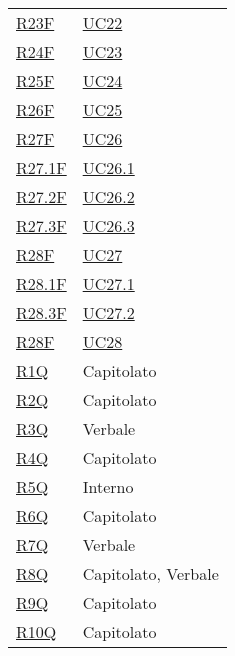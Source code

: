\begin{center}
\begin{longtable}[!h]{p{50px} p{50px}}
        \hyperref[tab:RequisitiFunzionali]{R23F}     & \hyperref[sec:UC22]{UC22}     \\
        \hyperref[tab:RequisitiFunzionali]{R24F}     & \hyperref[sec:UC23]{UC23}     \\
        \hyperref[tab:RequisitiFunzionali]{R25F}     & \hyperref[sec:UC24]{UC24}     \\
        \hyperref[tab:RequisitiFunzionali]{R26F}     & \hyperref[sec:UC25]{UC25}     \\
        \hyperref[tab:RequisitiFunzionali]{R27F}     & \hyperref[sec:UC26]{UC26}     \\
        \hyperref[tab:RequisitiFunzionali]{R27.1F}   & \hyperref[sec:UC26.1]{UC26.1} \\
        \hyperref[tab:RequisitiFunzionali]{R27.2F}   & \hyperref[sec:UC26.2]{UC26.2} \\
        \hyperref[tab:RequisitiFunzionali]{R27.3F}   & \hyperref[sec:UC26.3]{UC26.3} \\
        \hyperref[tab:RequisitiFunzionali]{R28F}     & \hyperref[sec:UC27]{UC27}     \\
        \hyperref[tab:RequisitiFunzionali]{R28.1F}   & \hyperref[sec:UC27.1]{UC27.1} \\
        \hyperref[tab:RequisitiFunzionali]{R28.3F}   & \hyperref[sec:UC27.2]{UC27.2} \\
        \hyperref[tab:RequisitiFunzionali]{R28F}     & \hyperref[sec:UC28]{UC28}     \\

        \hyperref[tab:RequisitiQualita]{R1Q}         & Capitolato                    \\
        \hyperref[tab:RequisitiQualita]{R2Q}         & Capitolato                    \\
        \hyperref[tab:RequisitiQualita]{R3Q}         & Verbale                       \\
        \hyperref[tab:RequisitiQualita]{R4Q}         & Capitolato                    \\
        \hyperref[tab:RequisitiQualita]{R5Q}         & Interno                       \\
        \hyperref[tab:RequisitiQualita]{R6Q}         & Capitolato                    \\
        \hyperref[tab:RequisitiQualita]{R7Q}         & Verbale                       \\
        \hyperref[tab:RequisitiQualita]{R8Q}         & Capitolato, Verbale           \\
        \hyperref[tab:RequisitiQualita]{R9Q}         & Capitolato                    \\
        \hyperref[tab:RequisitiQualita]{R10Q}        & Capitolato                    \\


\end{longtable}
\end{center}
